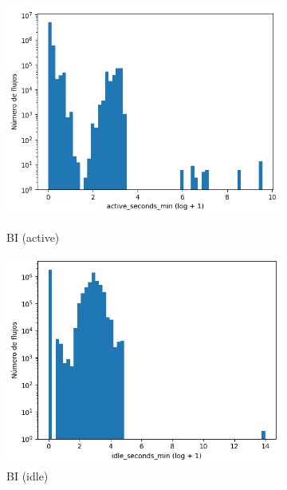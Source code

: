 \begin{figure}[H]
\begin{subfigure}[b]{0.26\textwidth}
        \includegraphics[width=\linewidth]{media/packet_pincer_botiot/active_seconds_min_log_x_log_y.png}
        \caption{BI (active)}
        \includegraphics[width=\linewidth]{media/packet_pincer_botiot/idle_seconds_min_log_x_log_y.png}
        \caption{BI (idle)}
    \end{subfigure}
    \hfill
    \begin{subfigure}[b]{0.26\textwidth}
        \centering

\end{subfigure}
\end{figure}
